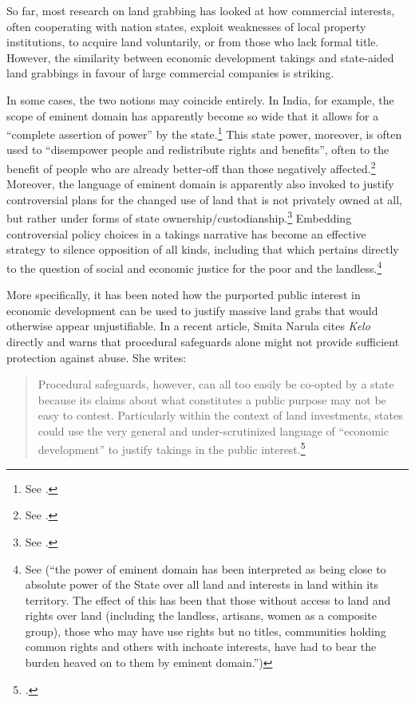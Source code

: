 So far, most research on land grabbing has looked at how commercial interests, often cooperating with nation states, exploit weaknesses of local property institutions, to acquire land voluntarily, or from those who lack formal title. However, the similarity between economic development takings and state-aided land grabbings in favour of large commercial companies is striking. 

In some cases, the two notions may coincide entirely. In India, for example, the scope of eminent domain has apparently become so wide that it allows for a ``complete assertion of power'' by the state.\footnote{See \cite[43]{cullet09}.} This state power, moreover, is often used to ``disempower people and redistribute rights and benefits'', often to the benefit of people who are already better-off than those negatively affected.\footnote{See \cite[33]{cullet09}.} Moreover, the language of eminent domain is apparently also invoked to justify controversial plans for the changed use of land that is not privately owned at all, but rather under forms of state ownership/custodianship.\footnote{See \cite[141]{mehta09}.} Embedding controversial policy choices in a takings narrative has become an effective strategy to silence opposition of all kinds, including that which pertains directly to the question of social and economic justice for the poor and the landless.\footnote{See \cite[143-144]{mehta09} (``the power of eminent domain has been interpreted as being close to absolute power of the State over all land and interests in land within its territory. The effect of this has been that those without access to land and rights over land (including the landless, artisans, women as a composite group), those who may have use rights but no titles, communities holding common rights and others with inchoate interests, have had to bear the burden heaved on to them by eminent domain.'')} 

More specifically, it has been noted how the purported public interest in economic development can be used to justify massive land grabs that would otherwise appear unjustifiable. In a recent article, Smita Narula cites {\it Kelo} directly and warns that procedural safeguards alone might not provide sufficient protection against abuse. She writes:

\begin{quote}
Procedural safeguards, however, can all too easily be co-opted by a state because its claims about what constitutes a public purpose may not be easy to contest. Particularly within the context of land investments, states could use the very general and under-scrutinized language of ``economic development'' to justify takings in the public interest.\footcite[157]{narula13}
\end{quote}

